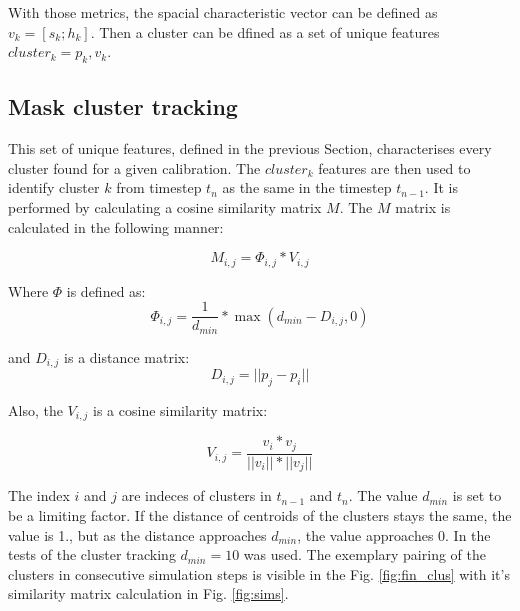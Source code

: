 With those metrics, the spacial characteristic vector can be defined as $v_k = [s_k; h_k]$. Then a cluster can be dfined as a set of unique features $cluster_k = {p_k, v_k}$.

\subsection{Mask cluster tracking}

This set of unique features, defined in the previous Section, characterises every cluster found for a given calibration.
The $cluster_{k}$ features are then used to identify cluster $k$ from timestep $t_{n}$ as the same in the timestep $t_{n-1}$.
It is performed by calculating a cosine similarity matrix $M$. The $M$ matrix is calculated in the following manner:

\begin{equation}
    M_{i,j} = \Phi_{i,j} * V_{i,j}
\end{equation}

Where $\Phi$ is defined as:
\begin{equation}
    \Phi_{i,j} = \frac{1}{d_{min}}*\max(d_{min} - D_{i,j}, 0)
\end{equation}

and $ D_{i,j} $ is a distance matrix:
 \begin{equation}D_{i,j} = || p_j - p_i ||\end{equation}

Also, the $V_{i,j}$ is a cosine similarity matrix:

\begin{equation}
V_{i,j} = \frac{v_i*v_j}{\lvert\lvert v_i \rvert\rvert*\lvert\lvert v_j \rvert\rvert}
\end{equation}

The index $i$ and $j$ are indeces of clusters in $t_{n-1}$ and $t_{n}$.
The value $d_{min}$ is set to be a limiting factor. If the distance of centroids of the clusters stays the same, the value is 1., but as the distance approaches $d_{min}$, the value approaches 0.
In the tests of the cluster tracking $d_{min}=10$ was used.
The exemplary pairing of the clusters in consecutive simulation steps is visible in the Fig. \ref{fig:fin_clus} with it's similarity matrix calculation in Fig. \ref{fig:sims}.

